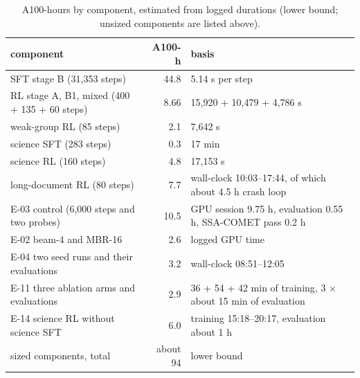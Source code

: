 \begin{table}[h]
\centering\small
\caption{A100-hours by component, estimated from logged durations (lower bound; unsized components are listed above).}\label{tab:compute}
\begin{tabular}{@{}lrl@{}}
\toprule
component & A100-h & basis\\
\midrule
SFT stage B (31,353 steps) & 44.8 & 5.14 s per step\\
RL stage A, B1, mixed (400 + 135 + 60 steps) & 8.66 & 15,920 + 10,479 + 4,786 s\\
weak-group RL (85 steps) & 2.1 & 7,642 s\\
science SFT (283 steps) & 0.3 & 17 min\\
science RL (160 steps) & 4.8 & 17,153 s\\
long-document RL (80 steps) & 7.7 & wall-clock 10:03--17:44, of which about 4.5 h crash loop\\
E-03 control (6,000 steps and two probes) & 10.5 & GPU session 9.75 h, evaluation 0.55 h, SSA-COMET pass 0.2 h\\
E-02 beam-4 and MBR-16 & 2.6 & logged GPU time\\
E-04 two seed runs and their evaluations & 3.2 & wall-clock 08:51--12:05\\
E-11 three ablation arms and evaluations & 2.9 & 36 + 54 + 42 min of training, 3 $\times$ about 15 min of evaluation\\
E-14 science RL without science SFT & 6.0 & training 15:18--20:17, evaluation about 1 h\\
\midrule
sized components, total & about 94 & lower bound\\
\bottomrule
\end{tabular}
\end{table}
